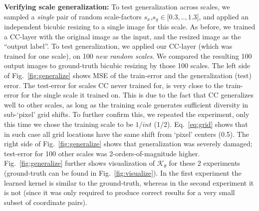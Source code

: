 \textbf{Verifying  scale generalization:} To test generalization across scales, we sampled a \emph{single}  pair of random scale-factors $s_x$,$s_y$$\in$$[0.3$$,..,$$1.3]$, and applied an independent bicubic resizing to a single image for this scale. As before, we trained a CC-layer with the original image as  the input, and the resized image as the ``output label''. To test generalization, we applied our CC-layer  (which was {trained} for one scale), on 100 \emph{new random scales}. We compared the resulting 100 output images to ground-truth bicubic resizing by those 100 scales. The left side of Fig.~\ref{fig:generalize} shows  MSE of the train-error and the generalization (test) error. The test-error for scales CC never trained for, is very close to the train-error for the single scale it trained on. This is due to the fact that CC generalizes well to other scales, as long as the training scale generates sufficient diversity in sub-`pixel' grid shifts. To further confirm this, we repeated the experiment, only this time we chose the training scale to be $1/int$ (1/2). Eq.~\ref{eq:grid} shows that in such case all grid locations have the same shift from `pixel' centers (0.5). The right side of Fig.~\ref{fig:generalize} shows that generalization was severely damaged; test-error for 100 other scales was 2-orders-of-magnitude higher. Fig.~\ref{fig:generalize} further shows visualization of $\mathcal{K}_\theta$ for these 2 experiments (ground-truth can be found in Fig.~\ref{fig:visualize}). In the first experiment the learned kernel is similar to the ground-truth, whereas in the second experiment it
is not (since it was only required to produce correct results for a very small subset of coordinate pairs).




